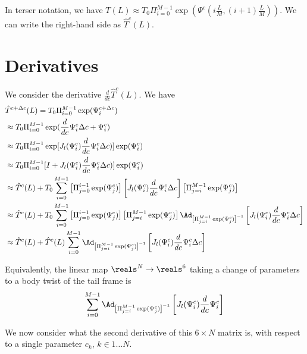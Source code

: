 \documentclass[12pt]{article}
\begin{document}
In terser notation, we have $T(L) \approx T_0 \Pi_{i=0}^{M-1} \exp(\Psi^c(i\frac{L}{M}, (i+1)\frac{L}{M}))$. We can write the right-hand side as $\hat T^c(L)$.

\section{Derivatives}

We consider the derivative $\frac{d}{dc} \hat T^c(L)$.
We have
\[
\begin{aligned}
  &\hat T^{c+\Delta c}(L) =  T_0 \Pi_{i=0}^{M-1} \exp(\Psi^{c+ \Delta c}_i)\\
  &\approx T_0 \Pi_{i=0}^{M-1} \exp(\frac{d}{dc}\Psi^c_i \Delta c + \Psi^c_i)\\
  &\approx T_0 \Pi_{i=0}^{M-1} \exp[J_l(\Psi^c_i) \frac{d}{dc}\Psi^c_i \Delta c)] \exp(\Psi^c_i)\\
  &\approx T_0 \Pi_{i=0}^{M-1} [I + J_l(\Psi^c_i)\frac{d}{dc}\Psi^c_i \Delta c)] \exp(\Psi^c_i)\\
  &\approx \hat T^{c}(L) + T_0\sum_{i=0}^{M-1}\left[\Pi_{j=0}^{i-1} \exp(\Psi^c_j)\right]  \left[J_l(\Psi^c_i)\frac{d}{dc}\Psi^c_i \Delta c\right] \left[\Pi_{j=i}^{M-1} \exp(\Psi^c_j)\right]\\
  &\approx \hat T^{c}(L) + T_0\sum_{i=0}^{M-1}\left[\Pi_{j=0}^{i-1} \exp(\Psi^c_j)\right]   \left[\Pi_{j=i}^{M-1} \exp(\Psi^c_j)\right] \Ad_{\left[\Pi_{j=i}^{M-1} \exp(\Psi^c_j)\right]^{-1}}\left[J_l(\Psi^c_i)\frac{d}{dc}\Psi^c_i \Delta c\right]\\
  &\approx \hat T^{c}(L) + \hat T^{c}(L) \sum_{i=0}^{M-1}\Ad_{\left[\Pi_{j=i}^{M-1} \exp(\Psi^c_j)\right]^{-1}}\left[J_l(\Psi^c_i)\frac{d}{dc}\Psi^c_i \Delta c\right]\\  \end{aligned}
\]

Equivalently, the linear map $\reals^N \rightarrow \reals^6$ taking a change of parameters to a body twist of the tail frame is 
$$\sum_{i=0}^{M-1}\Ad_{\left[\Pi_{j=i}^{M-1} \exp(\Psi^c_j)\right]^{-1}}\left[J_l(\Psi^c_i)\frac{d}{dc}\Psi^c_i \right]$$

We now consider what the second derivative of this $6 \times N$ matrix is, with respect to a single parameter $c_k$, $k \in 1 \ldots N$.
\end{document}
